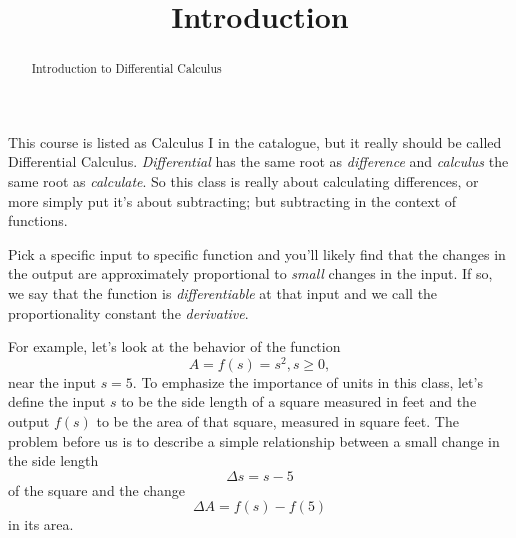 \documentclass{ximera}
\title{Introduction}
\begin{document}
\begin{abstract}
Introduction to Differential Calculus
\end{abstract}
\maketitle


This course is listed as Calculus I in the catalogue, but it really should be called Differential Calculus. \emph{Differential} has the same root as \emph{difference} and \emph{calculus} the same root as \emph{calculate}. So this class is really about calculating differences, or more simply put it's about subtracting; but subtracting in the context of functions. 


Pick a specific input to specific function and you'll likely find that the changes in the output are approximately proportional to \emph{small} changes in the input. If so, we say that the function is \emph{differentiable} at that input and we call the  proportionality constant the \emph{derivative}.

For example, let's look at the behavior of the function
\[
   A = f(s) = s^2 , s\geq 0,
\]
near the input $s=5$. To emphasize the importance of units in this class, let's define the input $s$ to be the side length of a square measured in feet and the output $f(s)$ to be the area of that square, measured in square feet. The problem before us is to describe a simple relationship between a small change in the side length 
\[
     \Delta s = s -5
\]
of the square and the change 
\[
   \Delta A = f(s) - f(5)
\]
in its area. 
\end{document}
